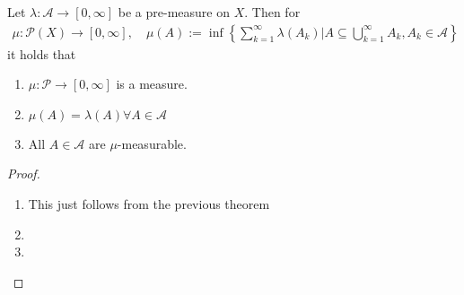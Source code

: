 \begin{thm}
  Let $\lambda: \mathcal{A} \to [0,\infty]$ be a pre-measure on $X$. Then for
  \begin{align*}
    \mu: \mathcal{P}(X) \to [0,\infty],\quad \mu(A) := \inf \left\{
      \sum_{k=1}^{\infty} \lambda(A_k) \big\vert A \subseteq \bigcup_{k=1}^{\infty}A_k, A_k \in \mathcal{A}
    \right\}
  \end{align*}
  it holds that
  \begin{enumerate}
    \item $\mu: \mathcal{P} \to [0,\infty]$ is a measure.
    \item $\mu(A) = \lambda(A) \forall A \in \mathcal{A}$
    \item All $A \in \mathcal{A}$ are $\mu$-measurable.
  \end{enumerate}
\end{thm}
\begin{proof}
\begin{enumerate}
  \item This just follows from the previous theorem
  \item 
  \item 
\end{enumerate}
\end{proof}

